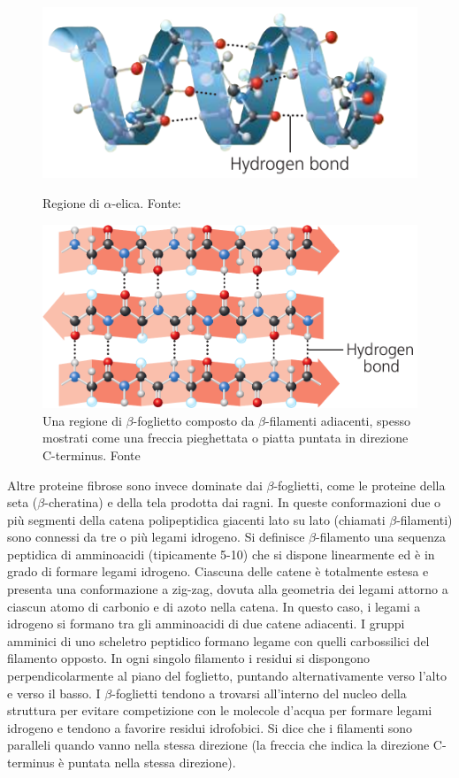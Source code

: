 {\begin{figure}[!htb]
	\includegraphics[scale=0.34]{images/eliche.png}
	\caption{Regione di $\alpha$-elica. Fonte: \cite{campbell}}
	\label{fig:eliche}
	\endminipage\hfill
	\centering
	\includegraphics[scale=0.31]{images/foglietti.png}
	\caption{Una regione di $\beta$-foglietto composto da $\beta$-filamenti adiacenti, spesso mostrati come una freccia pieghettata o piatta puntata in direzione C-terminus. Fonte \cite{campbell}}
	\label{fig:foglietti}
	\endminipage\hfill
\end{figure}

Altre proteine fibrose sono invece dominate dai $\beta$-foglietti, come le proteine della seta ($\beta$-cheratina) e della tela prodotta dai ragni. In queste conformazioni due o più segmenti della catena polipeptidica giacenti lato su lato (chiamati $\beta$-filamenti) sono connessi da tre o più legami idrogeno. Si definisce $\beta$-filamento una sequenza peptidica di amminoacidi (tipicamente 5-10) che si dispone linearmente ed è in grado di formare legami idrogeno. Ciascuna delle catene è totalmente estesa e presenta una conformazione a zig-zag, dovuta alla geometria dei legami attorno a ciascun atomo di carbonio e di azoto nella catena. In questo caso, i legami a idrogeno si formano tra gli amminoacidi di due catene adiacenti. I gruppi amminici di uno scheletro peptidico formano legame con quelli carbossilici del filamento opposto. In ogni singolo filamento i residui si dispongono perpendicolarmente al piano del foglietto, puntando alternativamente verso l'alto e verso il basso. I $\beta$-foglietti tendono a trovarsi all'interno del nucleo della struttura per evitare competizione con le molecole d'acqua per formare legami idrogeno e tendono a favorire residui idrofobici. Si dice che i filamenti sono paralleli quando vanno nella stessa direzione (la freccia che indica la direzione C-terminus è puntata nella stessa direzione).


}
